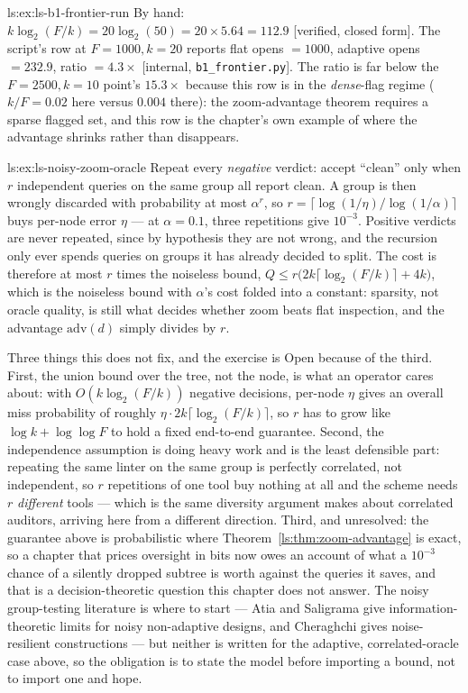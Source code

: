 \begin{pdSolution}{ls:ex:ls-b1-frontier-run}
By hand: $k\log_2(F/k)=20\log_2(50)=20\times5.64=112.9$ [verified, closed form]. The script's row at $F{=}1000,k{=}20$ reports flat opens $=1000$, adaptive opens $=232.9$, ratio $=4.3\times$ [internal, \texttt{b1\_frontier.py}]. The ratio is far below the $F{=}2500,k{=}10$ point's $15.3\times$ because this row is in the \emph{dense}-flag regime ($k/F=0.02$ here versus $0.004$ there): the zoom-advantage theorem requires a sparse flagged set, and this row is the chapter's own example of where the advantage shrinks rather than disappears.
\end{pdSolution}
\begin{pdSolution}{ls:ex:ls-noisy-zoom-oracle}
Repeat every \emph{negative} verdict: accept ``clean'' only when $r$ independent
queries on the same group all report clean. A group is then wrongly discarded with
probability at most $\alpha^{r}$, so $r=\lceil\log(1/\eta)/\log(1/\alpha)\rceil$
buys per-node error $\eta$ --- at $\alpha=0.1$, three repetitions give $10^{-3}$.
Positive verdicts are never repeated, since by hypothesis they are not wrong, and
the recursion only ever spends queries on groups it has already decided to split.
The cost is therefore at most $r$ times the noiseless bound,
$Q\le r\bigl(2k\lceil\log_2(F/k)\rceil+4k\bigr)$, which is the noiseless bound with
$\alpha$'s cost folded into a constant: sparsity, not oracle quality, is still what
decides whether zoom beats flat inspection, and the advantage
$\mathrm{adv}(d)$ simply divides by $r$.

Three things this does not fix, and the exercise is Open because of the third.
First, the union bound over the tree, not the node, is what an operator cares
about: with $O(k\log_2(F/k))$ negative decisions, per-node $\eta$ gives an overall
miss probability of roughly $\eta\cdot 2k\lceil\log_2(F/k)\rceil$, so $r$ has to
grow like $\log k+\log\log F$ to hold a fixed end-to-end guarantee. Second, the
independence assumption is doing heavy work and is the least defensible part:
repeating the same linter on the same group is perfectly correlated, not
independent, so $r$ repetitions of one tool buy nothing at all and the scheme
needs $r$ \emph{different} tools --- which is the same diversity argument
 makes about correlated auditors, arriving
here from a different direction. Third, and unresolved: the guarantee above is
probabilistic where Theorem~\ref{ls:thm:zoom-advantage} is exact, so a chapter that
prices oversight in bits now owes an account of what a $10^{-3}$ chance of a
silently dropped subtree is worth against the queries it saves, and that is a
decision-theoretic question this chapter does not answer. The noisy
group-testing literature is where to start --- Atia and Saligrama
 give information-theoretic limits for noisy
non-adaptive designs, and Cheraghchi  gives noise-resilient
constructions --- but neither is written for the adaptive, correlated-oracle case
above, so the obligation is to state the model before importing a bound, not to
import one and hope.
\end{pdSolution}
